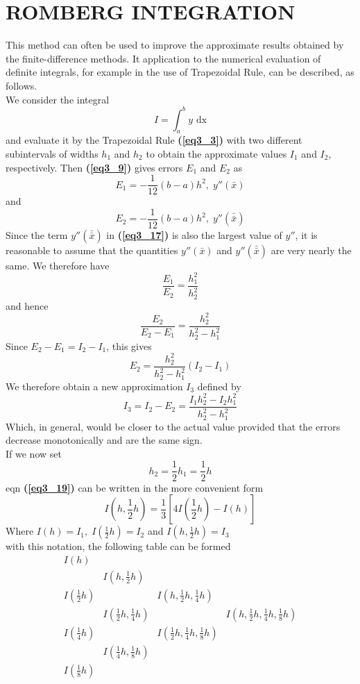 \documentclass[12pt]{report}
\newcommand{\sps}{\\[0.2cm]}
\newcommand{\refn}[1]{\textbf{(\ref{#1})}}
\newcommand{\dprime}{''}
\begin{document}
	\section{ROMBERG INTEGRATION}
	This method can often be used to improve the approximate results obtained by the finite-difference methods. It application to the numerical evaluation of definite integrals, for example in the use of Trapezoidal Rule, can be described, as follows.\sps
	We consider the integral
	$$
		I = \int_{a}^{b}y\text{ dx}
	$$
	and evaluate it by the Trapezoidal Rule \refn{eq3_3} with two different subintervals of widths $h_1$ and $h_2$ to obtain the approximate values $I_1$ and $I_2$, respectively. Then \refn{eq3_9} gives errors $E_1$ and $E_2$ as
	\begin{equation}
		E_1 = -\frac{1}{12}(b-a)h^2, \; y\dprime(\bar{x})
		\label{eq3_16}
	\end{equation}
	and
	\begin{equation}
		E_2 = -\frac{1}{12}(b-a)h^2, \; y\dprime(\bar{\bar{x}})
		\label{eq3_17}
	\end{equation}
	Since the term $y\dprime(\bar{\bar{x}})$ in \refn{eq3_17} is also the largest value of $y\dprime$, it is reasonable to assume that the quantities $y\dprime(\bar{x})$ and $y\dprime(\bar{\bar{x}})$ are very nearly the same. We therefore have
	$$
		\frac{E_1}{E_2} = \frac{h_1^2}{h_2^2}
	$$
	and hence
	$$
	\frac{E_2}{E_2 -E_1} = \frac{h_2^2}{h_2^2 - h_1^2}
	$$
	Since $E_2 - E_1 = I_2 - I_1$, this gives
	\begin{equation}
		E_2 = \frac{h_2^2}{h_2^2 - h_1^2}(I_2 - I_1)
		\label{eq3_18}
	\end{equation}
	We therefore obtain a new approximation $I_3$ defined by
	\begin{equation}
		I_3 = I_2 - E_2 = \frac{I_1h_2^2 - I_2h_1^2}{h_2^2 - h_1^2}
		\label{eq3_19}
	\end{equation}
	Which, in general, would be closer to the actual value provided that the errors decrease monotonically and are the same sign.\sps
	If we now set
	$$
		h_2 = \frac{1}{2}h_1 = \frac{1}{2}h
	$$
	eqn \refn{eq3_19} can be written in the more convenient form
	\begin{equation}
		I\left(h,\frac{1}{2}h\right) = \frac{1}{3}\left[4I\left(\frac{1}{2}h\right)- I\left(h\right)\right]
		\label{eq3_20}
	\end{equation}
	Where $I(h) = I_1, \; I(\frac{1}{2}h) = I_2$ and $I(h,\frac{1}{2}h) = I_3$\sps
	with this notation, the following table can be formed
	$$\begin{array}{cccc}
		I(h) & & &\\
		& I(h,\frac{1}{2}h) & & \\
		I(\frac{1}{2}h) & & I(h, \frac{1}{2}h, \frac{1}{4}h)& \\
		& I(\frac{1}{2}h, \frac{1}{4}h) & & I(h, \frac{1}{2}h, \frac{1}{4}h,\frac{1}{8}h)\\
		I(\frac{1}{4}h) & & I(\frac{1}{2}h, \frac{1}{4}h,\frac{1}{8}h) & \\
		& I(\frac{1}{4}h,\frac{1}{8}h)& &\\
		I(\frac{1}{8}h) & & & \\
	\end{array}$$
\end{document}
